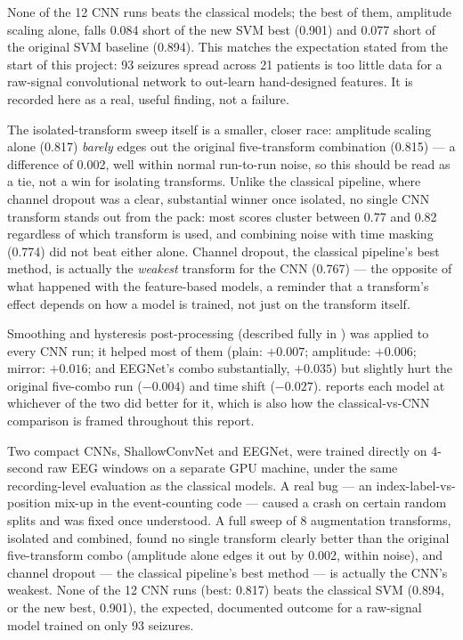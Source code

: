 None of the 12 CNN runs beats the classical models; the best of them, amplitude scaling alone,
falls 0.084 short of the new SVM best (0.901) and 0.077 short of the original SVM baseline
(0.894). This matches the expectation stated from the start of this project: 93 seizures spread
across 21 patients is too little data for a raw-signal convolutional network to out-learn
hand-designed features. It is recorded here as a real, useful finding, not a failure.

The isolated-transform sweep itself is a smaller, closer race: amplitude scaling alone
(0.817) \emph{barely} edges out the original five-transform combination (0.815) --- a
difference of 0.002, well within normal run-to-run noise, so this should be read as a tie, not a
win for isolating transforms. Unlike the classical pipeline, where channel dropout was a clear,
substantial winner once isolated, no single CNN transform stands out from the pack: most scores
cluster between 0.77 and 0.82 regardless of which transform is used, and combining noise with
time masking (0.774) did not beat either alone. Channel dropout, the classical pipeline's best
method, is actually the \emph{weakest} transform for the CNN (0.767) --- the opposite of what
happened with the feature-based models, a reminder that a transform's effect depends on how a
model is trained, not just on the transform itself.

Smoothing and hysteresis post-processing (described fully in ) was applied
to every CNN run; it helped most of them (plain: $+0.007$; amplitude: $+0.006$; mirror:
$+0.016$; and EEGNet's combo substantially, $+0.035$) but slightly hurt the original five-combo
run ($-0.004$) and time shift ($-0.027$).  reports each model at whichever
of the two did better for it, which is also how the classical-vs-CNN comparison is framed
throughout this report.

\begin{summarybox}
Two compact CNNs, ShallowConvNet and EEGNet, were trained directly on 4-second raw EEG windows
on a separate GPU machine, under the same recording-level evaluation as the classical models. A
real bug --- an index-label-vs-position mix-up in the event-counting code --- caused a crash on
certain random splits and was fixed once understood. A full sweep of 8 augmentation transforms,
isolated and combined, found no single transform clearly better than the original five-transform
combo (amplitude alone edges it out by 0.002, within noise), and channel dropout --- the
classical pipeline's best method --- is actually the CNN's weakest. None of the 12 CNN runs
(best: 0.817) beats the classical SVM (0.894, or the new best, 0.901), the expected, documented
outcome for a raw-signal model trained on only 93 seizures.
\end{summarybox}
